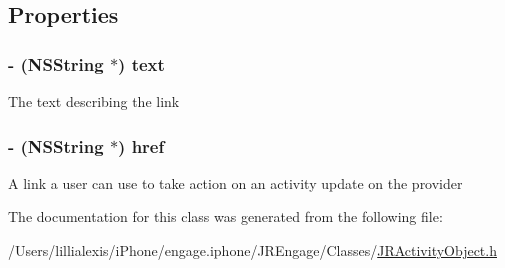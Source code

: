 \subsection{Properties}
\hypertarget{interface_j_r_action_link_a062c02005f1c35e651ffbcab51c50b21}{
\subsubsection[{text}]{\setlength{\rightskip}{0pt plus 5cm}-\/ (NSString $\ast$) text}}
\label{interface_j_r_action_link_a062c02005f1c35e651ffbcab51c50b21}
The text describing the link \hypertarget{interface_j_r_action_link_a45489781731e5965e20fa66af0bd3072}{
\subsubsection[{href}]{\setlength{\rightskip}{0pt plus 5cm}-\/ (NSString $\ast$) href}}
\label{interface_j_r_action_link_a45489781731e5965e20fa66af0bd3072}
A link a user can use to take action on an activity update on the provider 

The documentation for this class was generated from the following file:\begin{DoxyCompactItemize}
\item 
/Users/lillialexis/iPhone/engage.iphone/JREngage/Classes/\hyperlink{_j_r_activity_object_8h}{JRActivityObject.h}\end{DoxyCompactItemize}
